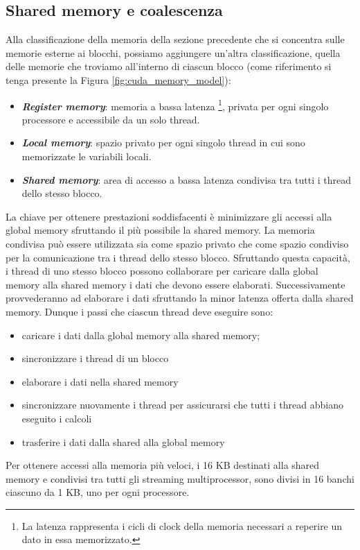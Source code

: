 \subsection{Shared memory e coalescenza}
\noindent Alla classificazione della memoria della sezione precedente che si concentra sulle memorie esterne ai blocchi, possiamo aggiungere un'altra classificazione, quella delle memorie che troviamo all'interno di ciascun blocco (come riferimento si tenga presente la Figura \ref{fig:cuda_memory_model}):
\begin{itemize}
    \item \textit{\textbf{Register memory}}: memoria a bassa latenza \footnote{La latenza rappresenta i cicli di clock della memoria necessari a reperire un dato in essa memorizzato. }, privata per ogni singolo processore e accessibile da un solo thread.
    \item \textit{\textbf{Local memory}}: spazio privato per ogni singolo thread in cui sono memorizzate le variabili locali.
    \item \textit{\textbf{Shared memory}}: area di accesso a bassa latenza condivisa tra tutti i thread dello stesso blocco.
\end{itemize}
\noindent La chiave per ottenere prestazioni soddisfacenti è minimizzare gli accessi alla global memory sfruttando il più possibile la shared memory. La memoria condivisa può essere utilizzata sia come spazio privato che come spazio condiviso per la comunicazione tra i thread dello stesso blocco. Sfruttando questa capacità, i thread di uno stesso blocco possono collaborare per caricare dalla global memory alla shared memory i dati che devono essere elaborati. Successivamente provvederanno ad elaborare i dati sfruttando la minor latenza offerta dalla shared memory. Dunque i passi che ciascun thread deve eseguire sono:
\begin{itemize}
    \item caricare i dati dalla global memory alla shared memory;
    \item sincronizzare i thread di un blocco
    \item elaborare i dati nella shared memory
    \item sincronizzare nuovamente i thread per assicurarsi che tutti i thread abbiano eseguito i calcoli
    \item trasferire i dati dalla shared alla global memory
\end{itemize}
Per ottenere accessi alla memoria più veloci, i 16 KB destinati alla shared memory e condivisi tra tutti gli streaming multiprocessor, sono divisi in 16 banchi ciascuno da 1 KB, uno per ogni processore.
